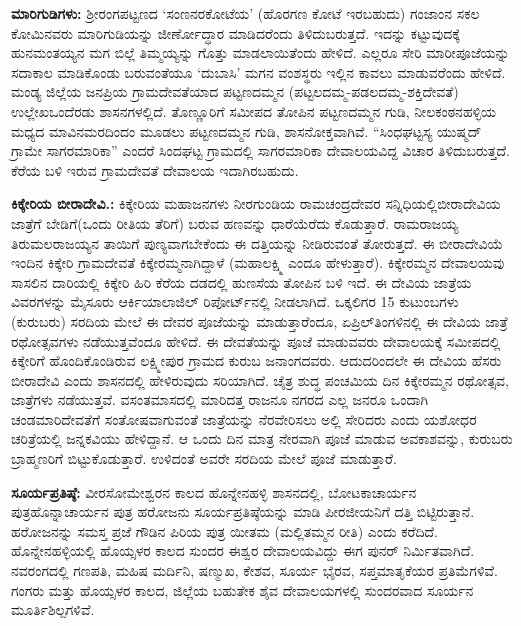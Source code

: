 \textbf{ಮಾರಿಗುಡಿಗಳು:} ಶ‍್ರೀರಂಗಪಟ್ಟಣದ ‘ಸಂಣನರಕೋಟೆಯ’ (ಹೊರಗಣ ಕೋಟೆ ಇರಬಹುದು) ಗಂಜಾಂನ ಸಕಲ ಕೋಮಿನವರು ಮಾರಿಗುಡಿಯನ್ನು ಜೀರ್ಣೋದ್ಧಾರ ಮಾಡಿದರೆಂದು ತಿಳಿದುಬರುತ್ತದೆ. ಇದನ್ನು ಕಟ್ಟುವುದಕ್ಕೆ ಹುನಮಂತಯ್ಯನ ಮಗ ಬಿಲ್ಲೆ ತಿಮ್ಮಯ್ಯನ್ನು ಗೊತ್ತು ಮಾಡಲಾಯಿತೆಂದು ಹೇಳಿದೆ. ಎಲ್ಲರೂ ಸೇರಿ ಮಾರೀಪೂಜೆಯನ್ನು ಸದಾಕಾಲ ಮಾಡಿಕೊಂಡು ಬರುವಂತೆಯೂ ‘ದುಬಾಸಿ’ ಮಗನ ವಂಶಸ್ಥರು ಇಲ್ಲಿನ ಕಾವಲು ಮಾಡುವರೆಂದು ಹೇಳಿದೆ. ಮಂಡ್ಯ ಜಿಲ್ಲೆಯ ಜನಪ್ರಿಯ ಗ್ರಾಮದೇವತೆಯಾದ ಪಟ್ಟಣದಮ್ಮನ (ಪಟ್ಟಲದಮ್ಮ-ಪಡಲದಮ್ಮ-ಶಕ್ತಿದೇವತೆ) ಉಲ್ಲೇಖ\break ಒಂದೆರಡು ಶಾಸನಗಳಲ್ಲಿದೆ. ತೊಣ್ಣೂರಿಗೆ ಸಮೀಪದ ತೋಪಿನ ಪಟ್ಟಣದಮ್ಮನ ಗುಡಿ, ನೀಲಕಂಠನಹಳ್ಳಿಯ ಮಧ್ಯದ ಮಾವಿನಮರದಿಂದಂ ಮೂಡಲು ಪಟ್ಟಣದಮ್ಮನ ಗುಡಿ, ಶಾಸನೋಕ್ತವಾಗಿವೆ. “ಸಿಂಧಘಟ್ಟಸ್ಯ ಯುಷ್ಮದ್​ ಗ್ರಾಮೇ ಸಾಗರಮಾರಿಕಾ” ಎಂದರೆ ಸಿಂದಘಟ್ಟ ಗ್ರಾಮದಲ್ಲಿ ಸಾಗರಮಾರಿಕಾ ದೇವಾಲಯವಿದ್ದ ವಿಚಾರ ತಿಳಿದುಬರುತ್ತದೆ. ಕೆರೆಯ ಬಳಿ ಇರುವ ಗ್ರಾಮದೇವತೆ ದೇವಾಲಯ ಇದಾಗಿರಬಹುದು.

\textbf{ಕಿಕ್ಕೇರಿಯ ಬೀರಾದೇವಿ.:} ಕಿಕ್ಕೇರಿಯ ಮಹಾಜನಗಳು ನೀರಗುಂಡಿಯ ರಾಮಚಂದ್ರದೇವರ ಸನ್ನಿಧಿಯಲ್ಲಿ\break ಬೀರಾದೇವಿಯ ಜಾತ್ರೆಗೆ ಬೇಡಿಗೆ(ಒಂದು ರೀತಿಯ ತೆರಿಗೆ) ಬರುವ ಹಣವನ್ನು ಧಾರೆಯೆರೆದು ಕೊಡುತ್ತಾರೆ. ರಾಮರಾಜಯ್ಯ ತಿರುಮಲರಾಜಯ್ಯನ ತಾಯಿಗೆ ಪುಣ್ಯವಾಗಬೇಕೆಂದು ಈ ದತ್ತಿಯನ್ನು ನೀಡಿರುವಂತೆ ತೋರುತ್ತದೆ. ಈ ಬೀರಾದೇವಿಯೆ ಇಂದಿನ ಕಿಕ್ಕೇರಿ ಗ್ರಾಮದೇವತೆ ಕಿಕ್ಕೇರಮ್ಮನಾಗಿದ್ದಾಳೆ (ಮಹಾಲಕ್ಷ್ಮಿ ಎಂದೂ ಹೇಳುತ್ತಾರೆ). ಕಿಕ್ಕೇರಮ್ಮನ ದೇವಾಲಯವು ಸಾಸಲಿನ ದಾರಿಯಲ್ಲಿ ಕಿಕ್ಕೇರಿ ಹಿರಿ ಕೆರೆಯ ದಡದಲ್ಲಿ ಹುಣಸೆಯ ತೋಪಿನ ಬಳಿ ಇದೆ. ಈ ದೇವಿಯ ಜಾತ್ರೆಯ ವಿವರಗಳನ್ನು ಮೈಸೂರು ಆರ್ಕಿಯಾಲಾಜಿಲ್​ ರಿಪೋರ್ಟ್‌ನಲ್ಲಿ ನೀಡಲಾಗಿದೆ. ಒಕ್ಕಲಿಗರ 15 ಕುಟುಂಬಗಳು (ಕುರುಬರು) ಸರದಿಯ ಮೇಲೆ ಈ ದೇವರ ಪೂಜೆಯನ್ನು ಮಾಡುತ್ತಾರೆಂದೂ, ಏಪ್ರಿಲ್​ ತಿಂಗಳಿನಲ್ಲಿ ಈ ದೇವಿಯ ಜಾತ್ರೆ ರಥೋತ್ಸವಗಳು ನಡೆಯುತ್ತವೆಂದೂ ಹೇಳಿದೆ. ಈ ದೇವತೆಯನ್ನು ಪೂಜೆ ಮಾಡುವವರು ದೇವಾಲಯಕ್ಕೆ ಸಮೀಪದಲ್ಲಿ ಕಿಕ್ಕೇರಿಗೆ ಹೊಂದಿಕೊಂಡಿರುವ ಲಕ್ಷ್ಮೀಪುರ ಗ್ರಾಮದ ಕುರುಬ ಜನಾಂಗದವರು. ಆದುದರಿಂದಲೇ ಈ ದೇವಿಯ ಹೆಸರು ಬೀರಾದೇವಿ ಎಂದು ಶಾಸನದಲ್ಲಿ ಹೇಳಿರುವುದು ಸರಿಯಾಗಿದೆ. ಚೈತ್ರ ಶುದ್ಧ ಪಂಚಮಿಯ ದಿನ ಕಿಕ್ಕೇರಮ್ಮನ ರಥೋತ್ಸವ, ಜಾತ್ರೆಗಳು ನಡೆಯುತ್ತವೆ. ವಸಂತಮಾಸದಲ್ಲಿ ಮಾರಿದತ್ತ ರಾಜನೂ ನಗರದ ಎಲ್ಲ ಜನರೂ ಒಂದಾಗಿ ಚಂಡಮಾರಿದೇವತೆಗೆ ಸಂತೋಷವಾಗುವಂತೆ ಜಾತ್ರೆಯನ್ನು ನೆರವೇರಿಸಲು ಅಲ್ಲಿ ಸೇರಿದರು ಎಂದು ಯಶೋಧರ ಚರಿತ್ರೆಯಲ್ಲಿ ಜನ್ನಕವಿಯು ಹೇಳಿದ್ದಾನೆ. ಆ ಒಂದು ದಿನ ಮಾತ್ರ ನೇರವಾಗಿ ಪೂಜೆ ಮಾಡುವ ಅವಕಾಶವನ್ನು, ಕುರುಬರು ಬ್ರಾಹ್ಮಣರಿಗೆ ಬಿಟ್ಟುಕೊಡುತ್ತಾರೆ. ಉಳಿದಂತೆ ಅವರೇ ಸರದಿಯ ಮೇಲೆ ಪೂಜೆ ಮಾಡುತ್ತಾರೆ.

\textbf{ಸೂರ್ಯಪ್ರತಿಷ್ಠೆ:} ವೀರಸೋಮೇಶ್ವರನ ಕಾಲದ ಹೊನ್ನೇನಹಳ್ಳಿ ಶಾಸನದಲ್ಲಿ, ಬೋಟಕಾಚಾರ್ಯನ ಪುತ್ರ\break ಹೊನ್ನಾಚಾರ್ಯನ ಪುತ್ರ ಹರೋಜನು ಸೂರ್ಯಪ್ರತಿಷ್ಠೆಯನ್ನು ಮಾಡಿ ಪೀರಜೀಯನಿಗೆ ದತ್ತಿ ಬಿಟ್ಟಿರುತ್ತಾನೆ. ಹರೋಜನನ್ನು ಸಮಸ್ತ ಪ್ರಜೆ ಗೌಡಿನ ಪಿರಿಯ ಪುತ್ರ ಯೀತಮ (ಮಲ್ಲಿತಮ್ಮನ ರೀತಿ) ಎಂದು ಕರೆದಿದೆ. ಹೊನ್ನೇನಹಳ್ಳಿಯಲ್ಲಿ ಹೊಯ್ಸಳರ ಕಾಲದ ಸುಂದರ ಈಶ್ವರ ದೇವಾಲಯವಿದ್ದು ಈಗ ಪುನರ್ ನಿರ್ಮಿತವಾಗಿದೆ. ನವರಂಗದಲ್ಲಿ ಗಣಪತಿ, ಮಹಿಷ ಮರ್ದಿನಿ, ಷಣ್ಮುಖ, ಕೇಶವ, ಸೂರ್ಯ ಭೈರವ, ಸಪ್ತಮಾತೃಕೆಯರ ಪ್ರತಿಮೆಗಳಿವೆ. ಗಂಗರು ಮತ್ತು ಹೊಯ್ಸಳರ ಕಾಲದ, ಜಿಲ್ಲೆಯ ಬಹುತೇಕ ಶೈವ ದೇವಾಲಯಗಳಲ್ಲಿ ಸುಂದರವಾದ ಸೂರ್ಯನ ಮೂರ್ತಿಶಿಲ್ಪಗಳಿವೆ.


